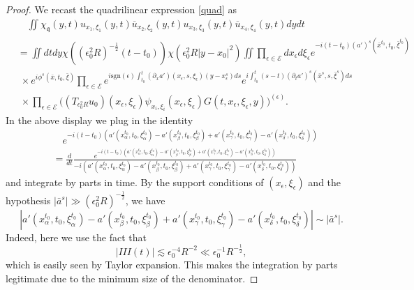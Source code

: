\documentclass{amsart}
\theoremstyle{definition}
\begin{document}
\begin{proof}
We recast the quadrilinear expression \eqref{quad} as
\begin{equation*}
    \begin{split}
        &\quad \iint \chi_{\mathfrak{q}}(y,t) u_{x_1,\xi_1}(y,t) \overline{u}_{x_2,\xi_2}(y,t) u_{x_3,\xi_3}(y,t) \overline{u}_{x_4,\xi_4}(y,t) dy dt \\
        &= \iint dt dy \chi((\epsilon_0^2 R)^{-\frac{1}{2}} (t-t_0)) \chi(\epsilon_0^2 R | y- x_0|^2)  \iint \prod_{\epsilon \in \mathcal{E}} d x_{\epsilon} d\xi_{\epsilon} e^{-i(t-t_0)(a')^s(\bar{x}^{t_0},t_0,\bar{\xi}^{t_0}) }  \\
        &\; \times e^{i \phi^s(\bar{x},t_0,\bar{\xi})} \prod_{\epsilon \in \mathcal{E}} e^{i \text{sgn}(\epsilon) \int_{t_0}^t (\partial_x a')(x_{\epsilon},s,\xi_{\epsilon})(y-x_{\epsilon}^s) ds }
        e^{i \int_{t_0}^t (s-t) (\partial_t a')^s(\bar{x}^s,s,\bar{\xi}^s) ds} \\
        &\; \times \prod_{\epsilon \in \mathcal{E}} \big( (T_{\epsilon_0^2 R}u_0)(x_{\epsilon},\xi_{\epsilon}) \psi_{x_i,\xi_i}(x_{\epsilon},\xi_{\epsilon}) G(t,x_{\epsilon},\xi_{\epsilon},y) \big)^{(\epsilon)}.
    \end{split}
\end{equation*}
In the above display we plug in the identity 
\begin{equation*}
\begin{split}
     &\quad e^{-i(t-t_0) (a'(x_{\alpha}^{t_0},t_0,\xi_{\alpha}^{t_0}) - a'(x_{\beta}^{t_0},t_0,\xi_{\beta}^{t_0}) + a'(x_{\gamma}^{t_0},t_0,\xi_{\gamma}^{t_0}) - a'(x_{\delta}^{t_0},t_0,\xi_{\delta}^{t_0}))} \\
     &= \frac{d}{dt} \frac{e^{-i(t-t_0) (a'(x_{\alpha}^{t_0},t_0,\xi_{\alpha}^{t_0}) - a'(x_{\beta}^{t_0},t_0,\xi_{\beta}^{t_0}) + a'(x_{\gamma}^{t_0},t_0,\xi_{\gamma}^{t_0}) - a'(x_{\delta}^{t_0},t_0,\xi_{\delta}^{t_0}))}}{-i(a'(x_{\alpha}^{t_0},t_0,\xi_{\alpha}^{t_0}) - a'(x_{\beta}^{t_0},t_0,\xi_{\beta}^{t_0}) + a'(x_{\gamma}^{t_0},t_0,\xi_{\gamma}^{t_0}) - a'(x_{\delta}^{t_0},t_0,\xi_{\delta}^{t_0}))}
     \end{split}
\end{equation*}
and integrate by parts in time. By the support conditions of $(x_{\epsilon},\xi_{\epsilon})$ and the hypothesis $|\bar{a}^s| \gg (\epsilon_0^2 R)^{-\frac{1}{2}}$, we have
\begin{equation*}
    | a'(x_{\alpha}^{t_0},t_0,\xi_{\alpha}^{t_0}) - a'(x_{\beta}^{t_0},t_0,\xi_{\beta}^{t_0}) + a'(x_{\gamma}^{t_0},t_0,\xi_{\gamma}^{t_0}) - a'(x_{\delta}^{t_0},t_0,\xi_{\delta}^{t_0}) | \sim |\bar{a}^s|.
\end{equation*}
Indeed, here we use the fact   that 
\[
|III(t)| \lesssim \epsilon_0^{-4} R^{-2} \ll \epsilon_0^{-1} R^{-\frac12},
\]
which is easily seen by Taylor expansion.
This makes the integration by parts legitimate due to the minimum size of the denominator.


\end{proof}
\end{document}
